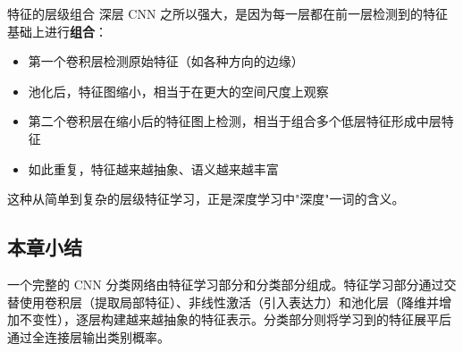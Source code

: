 \begin{knowledgebox}{特征的层级组合}
深层 CNN 之所以强大，是因为每一层都在前一层检测到的特征基础上进行\textbf{组合}：
\begin{itemize}
    \item 第一个卷积层检测原始特征（如各种方向的边缘）
    \item 池化后，特征图缩小，相当于在更大的空间尺度上观察
    \item 第二个卷积层在缩小后的特征图上检测，相当于组合多个低层特征形成中层特征
    \item 如此重复，特征越来越抽象、语义越来越丰富
\end{itemize}
这种从简单到复杂的层级特征学习，正是深度学习中"深度"一词的含义。
\end{knowledgebox}

\subsection{本章小结}

一个完整的 CNN 分类网络由特征学习部分和分类部分组成。特征学习部分通过交替使用卷积层（提取局部特征）、非线性激活（引入表达力）和池化层（降维并增加不变性），逐层构建越来越抽象的特征表示。分类部分则将学习到的特征展平后通过全连接层输出类别概率。

\newpage
